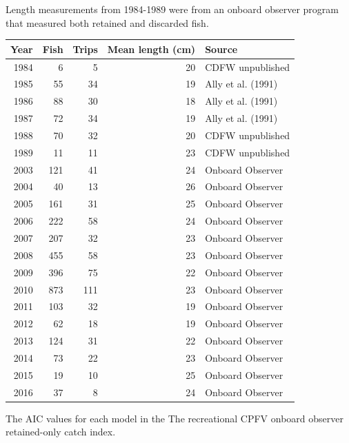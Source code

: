 \documentclass[12pt,]{article}
\begin{document}
\begin{table}[ht]
{                                            Length measurements from 1984-1989 were from an onboard
                                            observer program that measured both retained and discarded
                                            fish.} 
\label{tab:Fleet6_lengthsample}
\begin{tabular}{rrrrl}
  \hline
Year & Fish & Trips & Mean length (cm) & Source \\ 
  \hline
1984 & 6 & 5 & 20 & CDFW unpublished \\ 
  1985 & 55 & 34 & 19 & Ally et al. (1991) \\ 
  1986 & 88 & 30 & 18 & Ally et al. (1991) \\ 
  1987 & 72 & 34 & 19 & Ally et al. (1991) \\ 
  1988 & 70 & 32 & 20 & CDFW unpublished \\ 
  1989 & 11 & 11 & 23 & CDFW unpublished \\ 
  2003 & 121 & 41 & 24 & Onboard Observer \\ 
  2004 & 40 & 13 & 26 & Onboard Observer \\ 
  2005 & 161 & 31 & 25 & Onboard Observer \\ 
  2006 & 222 & 58 & 24 & Onboard Observer \\ 
  2007 & 207 & 32 & 23 & Onboard Observer \\ 
  2008 & 455 & 58 & 23 & Onboard Observer \\ 
  2009 & 396 & 75 & 22 & Onboard Observer \\ 
  2010 & 873 & 111 & 23 & Onboard Observer \\ 
  2011 & 103 & 32 & 19 & Onboard Observer \\ 
  2012 & 62 & 18 & 19 & Onboard Observer \\ 
  2013 & 124 & 31 & 22 & Onboard Observer \\ 
  2014 & 73 & 22 & 23 & Onboard Observer \\ 
  2015 & 19 & 10 & 25 & Onboard Observer \\ 
  2016 & 37 & 8 & 24 & Onboard Observer \\ 
   \hline
\end{tabular}
\end{table}\begin{table}[ht]
\centering
\caption{The AIC values for each model in the
                                          The recreational CPFV onboard 
                                          observer retained-only catch 
                                          index.} 
\label{tab:Fleet12_RecPC_onboard_aic}

\end{table}
\end{document}
